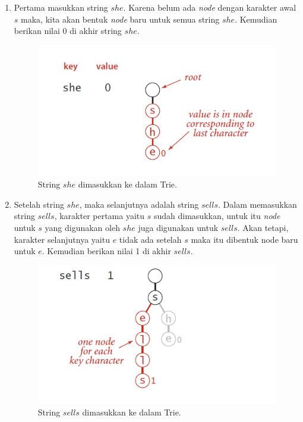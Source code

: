\begin{enumerate}
	\item Pertama masukkan string $she$. Karena belum ada \textit{node} dengan karakter awal $s$ maka, kita akan bentuk \textit{node} baru untuk semua string $she$. Kemudian berikan nilai 0 di akhir string $she$.
		\begin{figure}
			\includegraphics[width=\textwidth,keepaspectratio]{fig/FormTrie1.png}%
			\caption{String $she$ dimasukkan ke dalam Trie.}%
			\label{fig:FormTrie1}%
		\end{figure}
	\item Setelah string $she$, maka selanjutnya adalah string $sells$. Dalam memasukkan string $sells$, karakter pertama yaitu $s$ sudah dimasukkan, untuk itu \textit{node} untuk $s$ yang digunakan oleh $she$ juga digunakan untuk $sells$. Akan tetapi, karakter selanjutnya yaitu $e$ tidak ada setelah $s$ maka itu dibentuk node baru untuk $e$. Kemudian berikan nilai 1 di akhir $sells$.
		\begin{figure}
			\includegraphics[width=\textwidth,keepaspectratio]{fig/FormTrie2.png}%
			\caption{String $sells$ dimasukkan ke dalam Trie.}%

\end{figure}
\end{enumerate}

